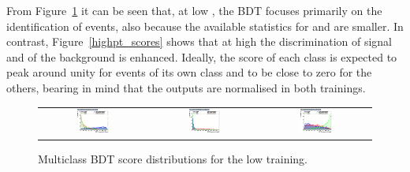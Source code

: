 From Figure~\ref{lowpt_scores} it can be seen that, at low \pth, the BDT focuses primarily on the identification of \ttbar events, also because the available statistics for \ttHtt and \ztautau are smaller. In contrast, Figure~\ref{highpt_scores} shows that at high \pth the discrimination of signal and of the \ztautau background is enhanced. Ideally, the score of each class is expected to peak around unity for events of its own class and to be close to zero for the others, bearing in mind that the outputs are normalised in both trainings.
\begin{figure}[htbp]
  \centering
  \setlength{\tabcolsep}{1.5pt}
  \renewcommand{\arraystretch}{0}
  \begin{tabular}{@{}c c c@{}}
    \includegraphics[width=0.32\textwidth]{images/plots_overtrain_lt200/overtrain_Signal_BDTG.png} &
    \includegraphics[width=0.32\textwidth]{images/plots_overtrain_lt200/overtrain_bkgZ_BDTG.png} &  
    \includegraphics[width=0.32\textwidth]{images/plots_overtrain_lt200/overtrain_bkgtt_BDTG.png}
  \end{tabular}
  \caption{Multiclass BDT score distributions for the low \pth training.}
  \label{lowpt_scores}
\end{figure}

